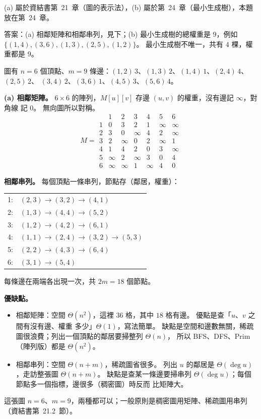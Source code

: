 \begin{pastsoln}
(a) 屬於資結書第~21~章（圖的表示法），(b) 屬於第~24~章（最小生成樹），本題放在第~24~章。

答案：(a) 相鄰矩陣和相鄰串列，見下；(b) 最小生成樹的總權重是 $9$，例如
$\{(1,4), (3,6), (1,3), (2,5), (1,2)\}$。 最小生成樹不唯一，共有 $4$ 棵，權重都是 $9$。

圖有 $n = 6$ 個頂點、$m = 9$ 條邊：$(1,2)\,3$、$(1,3)\,2$、$(1,4)\,1$、$(2,4)\,4$、$(2,5)\,2$、
$(3,4)\,2$、$(3,6)\,1$、$(4,5)\,3$、$(5,6)\,4$。

\textbf{(a) 相鄰矩陣。} $6 \times 6$ 的陣列，$M[u][v]$ 存邊 $(u, v)$ 的權重，沒有邊記 $\infty$，對角線
記 $0$。 無向圖所以對稱。
\[
M = \begin{array}{c|cccccc}
 & 1 & 2 & 3 & 4 & 5 & 6 \\ \hline
1 & 0 & 3 & 2 & 1 & \infty & \infty \\
2 & 3 & 0 & \infty & 4 & 2 & \infty \\
3 & 2 & \infty & 0 & 2 & \infty & 1 \\
4 & 1 & 4 & 2 & 0 & 3 & \infty \\
5 & \infty & 2 & \infty & 3 & 0 & 4 \\
6 & \infty & \infty & 1 & \infty & 4 & 0
\end{array}
\]

\textbf{相鄰串列。} 每個頂點一條串列，節點存（鄰居，權重）：
\begin{center}
\begin{tabular}{ll}
1: & $(2,3) \to (3,2) \to (4,1)$ \\
2: & $(1,3) \to (4,4) \to (5,2)$ \\
3: & $(1,2) \to (4,2) \to (6,1)$ \\
4: & $(1,1) \to (2,4) \to (3,2) \to (5,3)$ \\
5: & $(2,2) \to (4,3) \to (6,4)$ \\
6: & $(3,1) \to (5,4)$
\end{tabular}
\end{center}
每條邊在兩端各出現一次，共 $2m = 18$ 個節點。

\textbf{優缺點。}
\begin{itemize}
\item 相鄰矩陣：空間 $\Theta(n^2)$，這裡 $36$ 格，其中 $18$ 格有邊。 優點是查「$u$、$v$ 之間有沒有邊、權重
多少」$\Theta(1)$，寫法簡單。 缺點是空間和邊數無關，稀疏圖很浪費；列出一個頂點的鄰居要掃整列 $\Theta(n)$，
所以 BFS、DFS、Prim（陣列版）都是 $\Theta(n^2)$。
\item 相鄰串列：空間 $\Theta(n + m)$，稀疏圖省很多。 列出 $u$ 的鄰居是 $\Theta(\deg u)$，走訪整張圖
$\Theta(n + m)$。 缺點是查某一條邊要掃串列 $\Theta(\deg u)$；每個節點多一個指標，邊很多（稠密圖）時反而
比矩陣大。
\end{itemize}
這張圖 $n = 6$、$m = 9$，兩種都可以；一般原則是稠密圖用矩陣、稀疏圖用串列（資結書第~21.2~節）。


\end{pastsoln}
